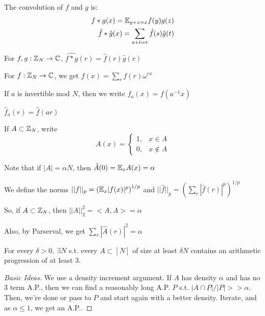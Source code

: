 \documentclass[a4paper]{article}
\begin{document}
{\begin{defi}[Convolution]
	The convolution of $f$ and $g$ is:
	\begin{align*}
		f*g(x) = \mathbb{E}_{y+z=x}f(y)g(z)\\
		\hat{f}*\hat{g}(x) = \sum_{s+t=r}\hat{f}(s)\hat{g}(t)
	\end{align*}
\end{defi}

\begin{fact}
	For $f,g:\mathbb{Z}_N \rightarrow \mathbb{C}$, $\hat{f*g}(r) = \hat{f}(r)\hat{g}(r)$
\end{fact}

\begin{fact}
	For $f:\mathbb{Z}_N \rightarrow \mathbb{C}$, we get $f(x)=\sum_{r}\hat{f}(r)\omega^{rx}$
\end{fact}


\begin{defi}
	If $a$ is invertible mod $N$, then we write $f_a(x) = f(a^{-1}x)$
\end{defi}

\begin{fact}
	$\hat{f}_a(r) = \hat{f}(ar)$
\end{fact}

\begin{defi}[Indicators]
	If $A\subset\mathbb{Z}_N$, write 
	\[
	A(x)=
	\begin{cases}
		1, &x\in A\\
		0, &x\notin A
	\end{cases}
	\]
\end{defi}

Note that if $|A|=\alpha N$, then $\hat{A}(0)=\mathbb{E}_xA(x)=\alpha$

\begin{defi}[Norms]
	We define the norms $||f||_p = \left(\mathbb{E}_x|f(x)|^p\right)^{1/p}$ and $||\hat{f}||_p = \left(\sum_r|\hat{f}(r)|^p\right)^{1/p}$
\end{defi}

So, if $A\subset\mathbb{Z}_N$, then $||A||_2^2=<A,A>=\alpha$

Also, by Parserval, we get $\sum_r\left|\hat{A}(r)\right|^2=\alpha$


\begin{thm}[Roth]
	For every $\delta>0,\ \exists N$ s.t. every $A \subset[N]$ of size at least $\delta N$ contains an arithmetic progression of at least 3.
\end{thm}
\begin{proof}[Basic Ideas]
	We use a density increment argument. If $A$ has density $\alpha$ and has no 3 term A.P., then we can find a reasonably long A.P. $P$ s.t. $|A\cap P|/|P| >>\alpha$. Then, we're done or pass to $P$ and start again with a better density. Iterate, and as $\alpha \leq1$, we get an A.P..
	

\end{proof}}
\end{document}
